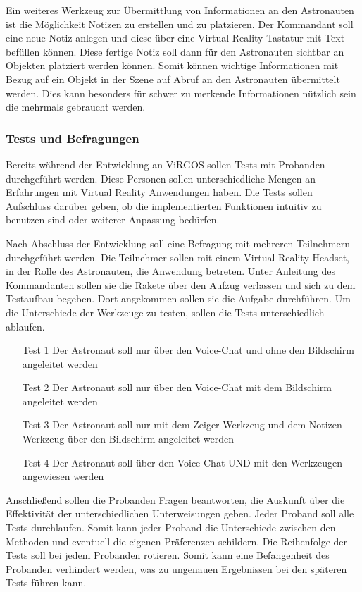 Ein weiteres Werkzeug zur Übermittlung von Informationen an den Astronauten ist die Möglichkeit Notizen zu erstellen und zu platzieren. Der Kommandant soll eine neue Notiz anlegen und diese über eine Virtual Reality Tastatur mit Text befüllen können. Diese fertige Notiz soll dann für den Astronauten sichtbar an Objekten platziert werden können. Somit können wichtige Informationen mit Bezug auf ein Objekt in der Szene auf Abruf an den Astronauten übermittelt werden. Dies kann besonders für schwer zu merkende Informationen nützlich sein die mehrmals gebraucht werden. 

\subsubsection{Tests und Befragungen}
Bereits während der Entwicklung an ViRGOS sollen Tests mit Probanden durchgeführt werden. Diese Personen sollen unterschiedliche Mengen an Erfahrungen mit Virtual Reality Anwendungen haben. Die Tests sollen Aufschluss darüber geben, ob die implementierten Funktionen intuitiv zu benutzen sind oder weiterer Anpassung bedürfen. 

Nach Abschluss der Entwicklung soll eine Befragung mit mehreren Teilnehmern durchgeführt werden. Die Teilnehmer sollen mit einem Virtual Reality Headset, in der Rolle des Astronauten, die Anwendung betreten. Unter Anleitung des Kommandanten sollen sie die Rakete über den Aufzug verlassen und sich zu dem Testaufbau begeben. Dort angekommen sollen sie die Aufgabe durchführen. Um die Unterschiede der Werkzeuge zu testen, sollen die Tests unterschiedlich ablaufen.

\begin{itemize}
\item[Test 1]  Der Astronaut soll nur über den Voice-Chat und ohne den Bildschirm angeleitet werden
\item[Test 2]  Der Astronaut soll nur über den Voice-Chat mit dem Bildschirm angeleitet werden
\item[Test 3]  Der Astronaut soll nur mit dem Zeiger-Werkzeug und dem Notizen-Werkzeug über den Bildschirm angeleitet werden
\item[Test 4]  Der Astronaut soll über den Voice-Chat UND mit den Werkzeugen angewiesen werden
\end{itemize}

Anschließend sollen die Probanden Fragen beantworten, die Auskunft über die Effektivität der unterschiedlichen Unterweisungen geben. Jeder Proband soll alle Tests durchlaufen. Somit kann jeder Proband die Unterschiede zwischen den Methoden und eventuell die eigenen Präferenzen schildern. Die Reihenfolge der Tests soll bei jedem Probanden rotieren. Somit kann eine Befangenheit des Probanden verhindert werden, was zu ungenauen Ergebnissen bei den späteren Tests führen kann. \newline

